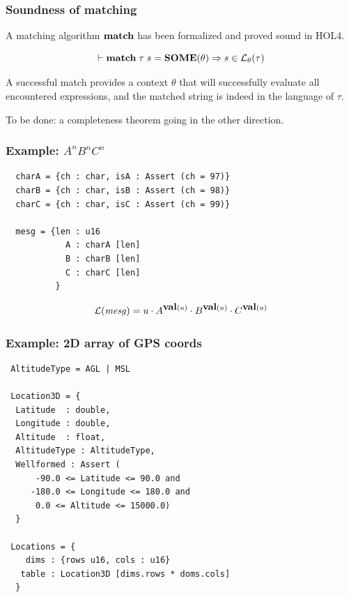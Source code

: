 \documentclass{beamer}
\newcommand{\imp}{\Rightarrow}
\newcommand{\konst}[1]{\ensuremath{\mbox{\bf{#1}}}}
\newcommand{\Lang}[1]{\ensuremath{{\cal L}({#1})}}
\newcommand{\LangTheta}[1]{\ensuremath{{\mathcal L}_{\theta}({#1})}}
\begin{document}
\begin{frame}[fragile]\frametitle{Soundness of matching}

A matching algorithm \konst{match} has been formalized and proved sound in HOL4.

\begin{theorem}
%
\[
  \vdash \konst{match}\; \tau \; s =\konst{SOME}(\theta) \imp s \in \LangTheta{\tau}
\]
%
\end{theorem}

A successful match provides a context $\theta$ that will successfully
evaluate all encountered expressions, and the matched string is indeed
in the language of $\tau$.

To be done: a completeness theorem going in the other direction.

\end{frame}


\begin{frame}[fragile]\frametitle{Example: $A^n B^n C^n$}

{\small
\begin{verbatim}
  charA = {ch : char, isA : Assert (ch = 97)}
  charB = {ch : char, isB : Assert (ch = 98)}
  charC = {ch : char, isC : Assert (ch = 99)}

  mesg = {len : u16
            A : charA [len]
            B : charB [len]
            C : charC [len]
          }
\end{verbatim}
}

\[
\Lang{\mathit{mesg}} = u \cdot A^{\konst{val}(u)} \cdot B^{\konst{val}(u)} \cdot C^{\konst{val}(u)} \]

\end{frame}


\begin{frame}[fragile]\frametitle{Example: 2D array of GPS coords}

{\small
\begin{verbatim}
 AltitudeType = AGL | MSL

 Location3D = {
  Latitude  : double,
  Longitude : double,
  Altitude  : float,
  AltitudeType : AltitudeType,
  Wellformed : Assert (
      -90.0 <= Latitude <= 90.0 and
     -180.0 <= Longitude <= 180.0 and
      0.0 <= Altitude <= 15000.0)
  }

 Locations = {
    dims : {rows u16, cols : u16}
   table : Location3D [dims.rows * doms.cols]
  }
\end{verbatim}
}
\end{frame}
\end{document}

